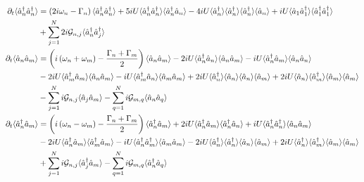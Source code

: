 \begin{align}
\partial_t\langle\hat{a}_n^\dagger\hat{a}_n^\dagger\rangle &= \left(2 i \omega_n - \Gamma_n  \right) \langle\hat{a}_n^\dagger\hat{a}_n^\dagger\rangle + 5 i U \langle\hat{a}_n^\dagger\hat{a}_n^\dagger\rangle\langle\hat{a}_n^\dagger \hat{a}_n\rangle - 4 i U \langle\hat{a}_n^\dagger\rangle\langle\hat{a}_n^\dagger\rangle\langle\hat{a}_n^\dagger\rangle\langle\hat{a}_n\rangle + i U \langle\hat{a}_1\hat{a}^\dagger_1\rangle \langle\hat{a}_1^\dagger\hat{a}_1^\dagger\rangle \notag \\
&+ \sum_{j=1}^N 2 i \mathcal{G}_{n, j} \langle\hat{a}_n^\dagger\hat{a}_j^\dagger\rangle \\
\partial_t\langle\hat{a}_n\hat{a}_m\rangle &= \left(i\left(\omega_n + \omega_m\right) - \frac{\Gamma_n + \Gamma_m}{2}\right)\langle\hat{a}_n\hat{a}_m\rangle - 2 i U \langle\hat{a}_n^\dagger\hat{a}_n\rangle \langle\hat{a}_n\hat{a}_m\rangle - i U \langle\hat{a}_n^\dagger\hat{a}_m\rangle \langle\hat{a}_n\hat{a}_n\rangle \notag \\
& - 2 i U \langle\hat{a}_m^\dagger\hat{a}_m\rangle\langle\hat{a}_n\hat{a}_m\rangle - i U \langle\hat{a}_m^\dagger\hat{a}_n\rangle\langle\hat{a}_m\hat{a}_m\rangle + 2 i U \langle\hat{a}_n^\dagger\rangle \langle\hat{a}_n\rangle \langle\hat{a}_n\rangle \langle\hat{a}_m\rangle + 2 i U \langle\hat{a}_n\rangle \langle\hat{a}_m^\dagger\rangle \langle\hat{a}_m\rangle\langle\hat{a}_m\rangle \notag \\
& - \sum_{j=1}^N i \mathcal{G}_{n, j}\langle\hat{a}_j\hat{a}_m\rangle - \sum_{q=1}^N i \mathcal{G}_{m, q} \langle\hat{a}_n\hat{a}_q\rangle \\
\partial_t\langle\hat{a}_n^\dagger\hat{a}_m\rangle &= \left(i\left(\omega_n - \omega_m\right) - \frac{\Gamma_n + \Gamma_m}{2}\right)\langle\hat{a}_n^\dagger\hat{a}_m\rangle + 2 i U \langle\hat{a}_n^\dagger\hat{a}_m \rangle \langle\hat{a}_n^\dagger \hat{a}_n\rangle + i U \langle \hat{a}_n^\dagger \hat{a}_n^\dagger\rangle\langle\hat{a}_n\hat{a}_m\rangle \notag \\
& - 2 i U \langle\hat{a}_n^\dagger \hat{a}_m \rangle \langle \hat{a}_m^\dagger \hat{a}_m\rangle - i U \langle\hat{a}_n^\dagger \hat{a}_m^\dagger\rangle \langle\hat{a}_m\hat{a}_m\rangle - 2 i U \langle\hat{a}_n^\dagger\rangle \langle\hat{a}_n^\dagger\rangle \langle\hat{a}_n\rangle \langle\hat{a}_m\rangle + 2 i U \langle\hat{a}_n^\dagger \rangle \langle \hat{a}_m^\dagger \rangle \langle \hat{a}_m\rangle \langle\hat{a}_m\rangle \notag \\
& + \sum_{j=1}^N i \mathcal{G}_{n, j}\langle\hat{a}_j^\dagger\hat{a}_m\rangle - \sum_{q=1}^N i \mathcal{G}_{m, q}\langle \hat{a}_n^\dagger \hat{a}_q\rangle \\

\end{align}
